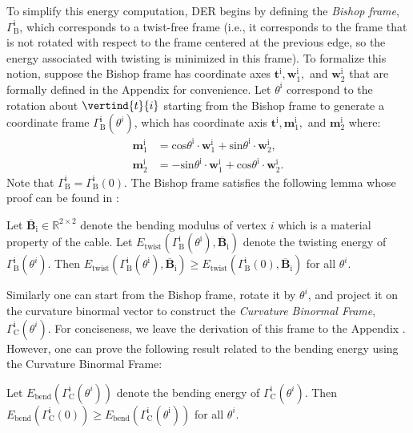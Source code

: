 To simplify this energy computation, DER begins by defining the \emph{Bishop frame}, $\Gamma^\text{i}_\text{B}$, which corresponds to a twist-free frame (i.e., it corresponds to the frame that is not rotated with respect to the frame centered at the previous edge, so the energy associated with twisting is minimized in this frame). 
To formalize this notion, suppose the Bishop frame has coordinate axes $\textbf{t}^\text{i}, \textbf{w}_1^\text{i},$ and $\textbf{w}_2^\text{i}$ that are formally defined in the Appendix for convenience.
Let $\theta^\text{i}$ correspond to the rotation about $\vertind{t}{i}$ starting from the Bishop frame to generate a coordinate frame $\Gamma^\text{i}_\text{B}(\theta^i)$, which has coordinate axis $\textbf{t}^\text{i}, \textbf{m}_1^\text{i},$ and $\textbf{m}_2^\text{i}$ where:
\begin{align}
    \textbf{m}_1^\text{i}&=\text{cos}\theta^\text{i}\cdot \textbf{w}_1^\text{i} + \text{sin}\theta^\text{i}\cdot \textbf{w}_2^\text{i},\\
    \textbf{m}_2^\text{i}&=-\text{sin}\theta^\text{i}\cdot \textbf{w}_1^\text{i} + \text{cos}\theta^\text{i}\cdot \textbf{w}_2^\text{i}.
\end{align}
Note that  $\Gamma^\text{i}_\text{B} = \Gamma^\text{i}_\text{B}(0)$.
The Bishop frame satisfies the following lemma whose proof can be found in :
\begin{lem}
\label{lem:bishop_twist}
Let  $\overline{\textbf{B}}_\text{i} \in \mathbb{R}^{2 \times 2}$ denote the bending modulus of vertex $i$ which is a material property of the cable.
    Let $E_\text{twist}(\Gamma^\text{i}_\text{B}(\theta^\text{i}),\overline{\textbf{B}}_\text{i})$ denote the twisting energy of $\Gamma^\text{i}_\text{B}(\theta^i)$. 
    Then $E_\text{twist}(\Gamma^\text{i}_\text{B}(\theta^\text{i}),\overline{\textbf{B}}_\text{i})\geq E_\text{twist}(\Gamma^\text{i}_\text{B}(0),\overline{\textbf{B}}_\text{i})$ for all $\theta^i$.
\end{lem}
Similarly one can start from the Bishop frame, rotate it by $\theta^i$, and project it on the curvature binormal vector to construct the \emph{Curvature Binormal Frame}, $\Gamma^\text{i}_\text{C}(\theta^i)$. 
For conciseness, we leave the derivation of this frame to the Appendix . 
However, one can prove the following result related to the bending energy using the Curvature Binormal Frame:
\begin{lem}
\label{lem:bishop_bend}
    Let $E_\text{bend}(\Gamma^\text{i}_\text{C}(\theta^i))$ denote the bending energy of $\Gamma^\text{i}_\text{C}(\theta^i)$. 
    Then $E_\text{bend}(\Gamma^\text{i}_\text{C}(0))\geq E_\text{bend}(\Gamma^\text{i}_\text{C}(\theta^\text{i}))$ for all $\theta^i$.
\end{lem}
